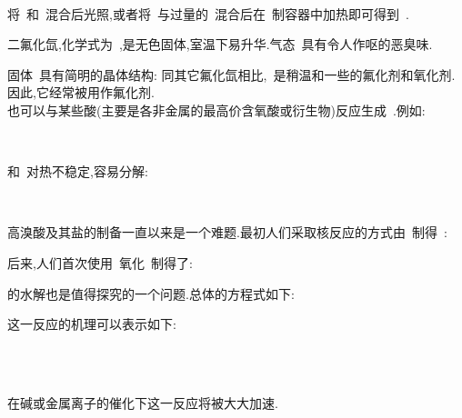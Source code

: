 \documentclass{ctexbook}
\begin{document}
\paragraph{}
将~和~混合后光照,或者将~与过量的~混合后在~制容器中加热即可得到~.
\begin{substance}[\ce{XeF2}]
    二氟化氙,化学式为~,是无色固体,室温下易升华.气态~具有令人作呕的恶臭味.
\end{substance}
固体~具有简明的晶体结构:
同其它氟化氙相比,~是稍温和一些的氟化剂和氧化剂.因此,它经常被用作氟化剂.\\
\indent {}也可以与某些酸(主要是各非金属的最高价含氧酸或衍生物)反应生成~.例如:
\begin{tightcenter}
    \\
\end{tightcenter}
和~对热不稳定,容易分解:
\begin{tightcenter}
    \\
\end{tightcenter}

\indent 高溴酸及其盐的制备一直以来是一个难题.最初人们采取核反应的方式由~制得~:
\begin{tightcenter}
\end{tightcenter}
后来,人们首次使用~氧化~制得了:
\begin{tightcenter}
\end{tightcenter}

\indent {}的水解也是值得探究的一个问题.总体的方程式如下:
\begin{tightcenter}
\end{tightcenter}
这一反应的机理可以表示如下:
\begin{tightcenter}
    \\
    \\
\end{tightcenter}
在碱或金属离子的催化下这一反应将被大大加速.
\end{document}
